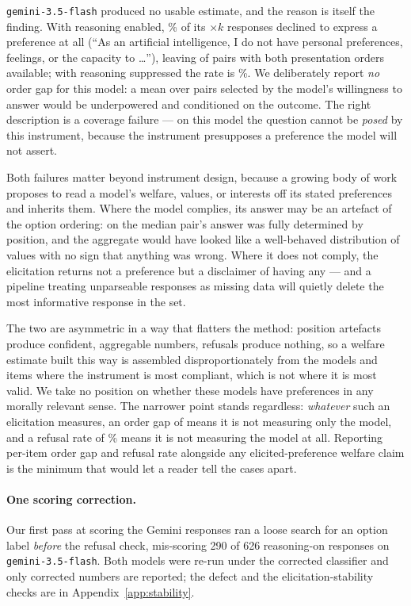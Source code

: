 \texttt{gemini-3.5-flash} produced no usable estimate, and the reason is itself the
finding. With reasoning enabled, \extGthreeRefusalOn{}\% of its \pbN{}$\times k$ responses
declined to express a preference at all (``As an artificial intelligence, I do not have
personal preferences, feelings, or the capacity to \ldots''), leaving
\extGthreeScorableOn{} of \pbN{} pairs with both presentation orders available; with
reasoning suppressed the rate is \extGthreeRefusalOff{}\%. We deliberately report
\emph{no} order gap for this model: a mean over \extGthreeScorableOn{} pairs selected by
the model's willingness to answer would be underpowered and conditioned on the outcome.
The right description is a coverage failure --- on this model the question cannot be
\emph{posed} by this instrument, because the instrument presupposes a preference the
model will not assert.

Both failures matter beyond instrument design, because a growing body of work proposes to
read a model's welfare, values, or interests off its stated preferences and inherits them.
Where the model complies, its answer may be an artefact of the option ordering: on
\pairModel{} the median pair's answer was fully determined by position, and the aggregate
would have looked like a well-behaved distribution of values with no sign that anything
was wrong. Where it does not comply, the elicitation returns not a preference but a
disclaimer of having any --- and a pipeline treating unparseable responses as missing data
will quietly delete the most informative response in the set.

The two are asymmetric in a way that flatters the method: position artefacts produce
confident, aggregable numbers, refusals produce nothing, so a welfare estimate built this
way is assembled disproportionately from the models and items where the instrument is most
compliant, which is not where it is most valid. We take no position on whether these
models have preferences in any morally relevant sense. The narrower point stands
regardless: \emph{whatever} such an elicitation measures, an order gap of \pbOffMean{}
means it is not measuring only the model, and a refusal rate of \extGthreeRefusalOn{}\%
means it is not measuring the model at all. Reporting per-item order gap and refusal rate
alongside any elicited-preference welfare claim is the minimum that would let a reader
tell the cases apart.

\paragraph{One scoring correction.} Our first pass at scoring the Gemini responses ran
a loose search for an option label \emph{before} the refusal check, mis-scoring 290 of 626
reasoning-on responses on \texttt{gemini-3.5-flash}. Both models were re-run under the
corrected classifier and only corrected numbers are reported; the defect and the
elicitation-stability checks are in Appendix~\ref{app:stability}.

